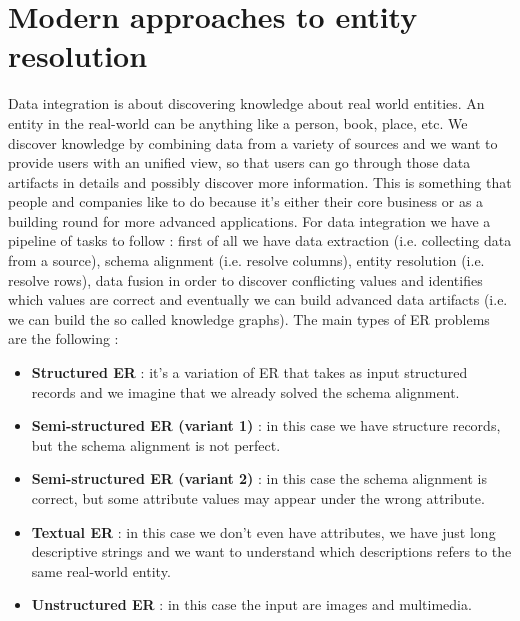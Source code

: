 \documentclass[11pt]{article}
\begin{document}
\section{Modern approaches to entity resolution}
Data integration is about discovering knowledge about real world entities. An entity in the real-world can be anything like a person, book, place, etc. We discover knowledge by combining data from a variety of sources and we want to provide users with an unified view, so that users can go through those data artifacts in details and possibly discover more information. This is something that people and companies like to do because it's either their core business or as a building round for more advanced applications. For data integration we have a pipeline of tasks to follow : first of all we have data extraction (i.e. collecting data from a source), schema alignment (i.e. resolve columns), entity resolution (i.e. resolve rows), data fusion in order to discover conflicting values and identifies which values are correct and eventually we can build advanced data artifacts (i.e. we can build the so called knowledge graphs). The main types of ER problems are the following :
\begin{itemize}
\item \textbf{Structured ER} : it's a variation of ER that takes as input structured records and we imagine that we already solved the schema alignment.

\item \textbf{Semi-structured ER (variant 1)} : in this case we have structure records, but the schema alignment is not perfect.

\item \textbf{Semi-structured ER (variant 2)} : in this case the schema alignment is correct, but some attribute values may appear under the wrong attribute.

\item \textbf{Textual ER} : in this case we don't even have attributes, we have just long descriptive strings and we want to understand which descriptions refers to the same real-world entity.

\item \textbf{Unstructured ER} : in this case the input are images and multimedia.
\end{itemize}
\end{document}
